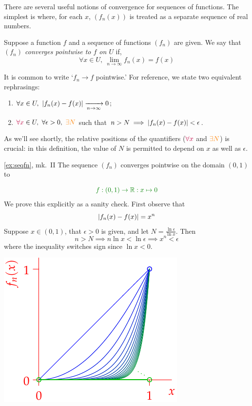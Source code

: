 There are several useful notions of convergence for sequences of functions. The simplest is where, for each $x$, $(f_n(x))$ is treated as a separate sequence of real numbers.\goodbreak

\begin{defn}{}{}
Suppose a function $f$ and a sequence of functions $(f_n)$ are given. We say that \emph{$(f_n)$ converges pointwise to $f$ on $U$} if,
\[\forall x\in U,\ \lim\limits_{n\to\infty}f_n(x)=f(x)\]
\end{defn}

It is common to write `$f_n\to f$ pointwise.' For reference, we state two equivalent rephrasings:
\begin{enumerate}
  \item $\displaystyle \forall x\in U, \ \nm{f_n(x)-f(x)}\xrightarrow[n\to\infty]{}0$;
  \item $\textcolor{purple}{\forall x}\in U,\ \forall \epsilon>0,\ \textcolor{orange}{\exists N}$ such that $n>N\implies \left| f_n(x)-f(x)\right|<\epsilon$.
\end{enumerate}
As we'll see shortly, the relative positions of the quantifiers ($\textcolor{purple}{\forall x}$ and $\textcolor{orange}{\exists N}$) is crucial: in this definition, the value of $N$ is permitted to depend on $x$ as well as $\epsilon$.
\vspace*{10pt}


\begin{example*}{\ref{ex:seqfn}, mk.\ II}{}
The sequence $(f_n)$ converges pointwise on the domain $(0,1)$ to\smallbreak
\begin{minipage}[t]{0.6\linewidth}\vspace{-12pt}
\[\textcolor{Green}{f:(0,1)\to\R:x\mapsto 0}\]
We prove this explicitly as a sanity check. First observe that
\[\left| f_n(x)-f(x)\right|=x^n\]
Suppose $x\in(0,1)$, that $\epsilon>0$ is given, and let $N=\frac{\ln\epsilon}{\ln x}$. Then
\[n>N\implies n\ln x<\ln\epsilon\implies x^n<\epsilon\]
where the inequality switches sign since $\ln x<0$.
\end{minipage}\begin{minipage}[t]{0.4\linewidth}\vspace{0pt}
\flushright\includegraphics{seqex2}
\end{minipage}
\end{example*}

